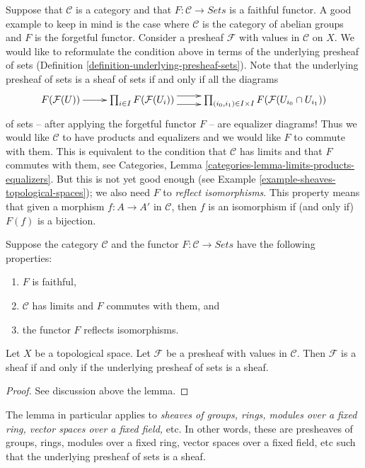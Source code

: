 \noindent
Suppose that $\mathcal{C}$ is a category and that
$F : \mathcal{C} \to \textit{Sets}$ is a faithful functor.
A good example to keep in mind is the case where $\mathcal{C}$
is the category of abelian groups and $F$ is the forgetful functor.
Consider a presheaf $\mathcal{F}$ with values in $\mathcal{C}$ on $X$.
We would like to reformulate the condition above in terms
of the underlying presheaf of sets
(Definition \ref{definition-underlying-presheaf-sets}).
Note that the underlying
presheaf of sets is a sheaf of sets if and only if all the
diagrams
$$
\xymatrix{
F(\mathcal{F}(U)) \ar[r]
&
\prod\nolimits_{i\in I}
F(\mathcal{F}(U_i))
\ar@<1ex>[r] \ar@<-1ex>[r]
&
\prod\nolimits_{(i_0, i_1) \in I\times I}
F(\mathcal{F}(U_{i_0} \cap U_{i_1}))
}
$$
of sets -- after applying the forgetful functor $F$ -- are
equalizer diagrams! Thus we would like $\mathcal{C}$ to have
products and equalizers and we would like $F$ to commute with
them. This is equivalent to the condition that $\mathcal{C}$
has limits and that $F$ commutes with them, see 
Categories, Lemma \ref{categories-lemma-limits-products-equalizers}.
But this is not yet good enough
(see Example \ref{example-sheaves-topological-spaces});
we also need $F$ to {\it reflect isomorphisms}.
This property means that given a morphism
$f : A \to A'$ in $\mathcal{C}$, then $f$ is
an isomorphism if (and only if) $F(f)$ is a bijection.

\begin{lemma}
\label{lemma-sheaves-structure}
Suppose the category $\mathcal{C}$ and
the functor $F : \mathcal{C} \to \textit{Sets}$
have the following properties:
\begin{enumerate}
\item $F$ is faithful,
\item $\mathcal{C}$ has limits and $F$ commutes with them, and
\item the functor $F$ reflects isomorphisms.
\end{enumerate}
Let $X$ be a topological space. Let $\mathcal{F}$
be a presheaf with values in $\mathcal{C}$.
Then $\mathcal{F}$ is a sheaf if and only if the
underlying presheaf of sets is a sheaf.
\end{lemma}

\begin{proof}
See discussion above the lemma.
\end{proof}

\noindent
The lemma in particular applies to
{\it sheaves of groups, rings, modules
over a fixed ring, vector spaces over a fixed field,} etc.
In other words, these are presheaves of groups, rings,
modules over a fixed ring, vector spaces over a fixed field, etc
such that the underlying presheaf of sets is a sheaf.


